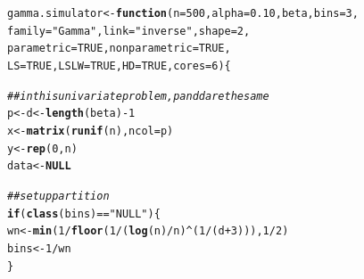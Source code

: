 \documentclass[11pt]{article}\usepackage[]{graphicx}\usepackage[]{color}
\makeatletter
\newcommand{\hlnum}[1]{\textcolor[rgb]{0.686,0.059,0.569}{#1}}%
\newcommand{\hlstr}[1]{\textcolor[rgb]{0.192,0.494,0.8}{#1}}%
\newcommand{\hlcom}[1]{\textcolor[rgb]{0.678,0.584,0.686}{\textit{#1}}}%
\newcommand{\hlopt}[1]{\textcolor[rgb]{0,0,0}{#1}}%
\newcommand{\hlstd}[1]{\textcolor[rgb]{0.345,0.345,0.345}{#1}}%
\newcommand{\hlkwa}[1]{\textcolor[rgb]{0.161,0.373,0.58}{\textbf{#1}}}%
\newcommand{\hlkwb}[1]{\textcolor[rgb]{0.69,0.353,0.396}{#1}}%
\newcommand{\hlkwc}[1]{\textcolor[rgb]{0.333,0.667,0.333}{#1}}%
\newcommand{\hlkwd}[1]{\textcolor[rgb]{0.737,0.353,0.396}{\textbf{#1}}}%
\newenvironment{kframe}{%
 \def\at@end@of@kframe{}%
 \ifinner\ifhmode%
  \def\at@end@of@kframe{\end{minipage}}%
  \begin{minipage}{\columnwidth}%
 \fi\fi%
 \def\FrameCommand##1{\hskip\@totalleftmargin \hskip-\fboxsep
 \colorbox{shadecolor}{##1}\hskip-\fboxsep
     \hskip-\linewidth \hskip-\@totalleftmargin \hskip\columnwidth}%
 \MakeFramed {\advance\hsize-\width
   \@totalleftmargin\z@ \linewidth\hsize
   \@setminipage}}%
 {\par\unskip\endMakeFramed%
 \at@end@of@kframe}
\newenvironment{knitrout}{}{} %
\makeatother
\begin{document}
\begin{knitrout}
\color{fgcolor}\begin{kframe}
\begin{alltt}
\hlstd{gamma.simulator} \hlkwb{<-} \hlkwa{function}\hlstd{(}\hlkwc{n} \hlstd{=} \hlnum{500}\hlstd{,} \hlkwc{alpha} \hlstd{=} \hlnum{0.10}\hlstd{,} \hlkwc{beta}\hlstd{,} \hlkwc{bins} \hlstd{=} \hlnum{3}\hlstd{,}
  \hlkwc{family} \hlstd{=} \hlstr{"Gamma"}\hlstd{,} \hlkwc{link} \hlstd{=} \hlstr{"inverse"}\hlstd{,} \hlkwc{shape} \hlstd{=} \hlnum{2}\hlstd{,}
  \hlkwc{parametric} \hlstd{=} \hlnum{TRUE}\hlstd{,} \hlkwc{nonparametric} \hlstd{=} \hlnum{TRUE}\hlstd{,}
  \hlkwc{LS} \hlstd{=} \hlnum{TRUE}\hlstd{,} \hlkwc{LSLW} \hlstd{=} \hlnum{TRUE}\hlstd{,} \hlkwc{HD} \hlstd{=} \hlnum{TRUE}\hlstd{,} \hlkwc{cores} \hlstd{=} \hlnum{6}\hlstd{)\{}

  \hlcom{## in this univariate problem, p and d are the same}
  \hlstd{p} \hlkwb{<-} \hlstd{d} \hlkwb{<-} \hlkwd{length}\hlstd{(beta)} \hlopt{-} \hlnum{1}
  \hlstd{x} \hlkwb{<-} \hlkwd{matrix}\hlstd{(}\hlkwd{runif}\hlstd{(n),} \hlkwc{ncol} \hlstd{= p)}
  \hlstd{y} \hlkwb{<-} \hlkwd{rep}\hlstd{(}\hlnum{0}\hlstd{,n)}
  \hlstd{data} \hlkwb{<-} \hlkwa{NULL}

  \hlcom{## set up partition}
  \hlkwa{if}\hlstd{(}\hlkwd{class}\hlstd{(bins)} \hlopt{==} \hlstr{"NULL"}\hlstd{)\{}
    \hlstd{wn} \hlkwb{<-} \hlkwd{min}\hlstd{(}\hlnum{1}\hlopt{/} \hlkwd{floor}\hlstd{(}\hlnum{1} \hlopt{/} \hlstd{(}\hlkwd{log}\hlstd{(n)}\hlopt{/}\hlstd{n)}\hlopt{^}\hlstd{(}\hlnum{1}\hlopt{/}\hlstd{(d}\hlopt{+}\hlnum{3}\hlstd{))),} \hlnum{1}\hlopt{/}\hlnum{2}\hlstd{)}
    \hlstd{bins} \hlkwb{<-} \hlnum{1} \hlopt{/} \hlstd{wn}
  \hlstd{\}}


\end{alltt}
\end{kframe}
\end{knitrout}
\end{document}
